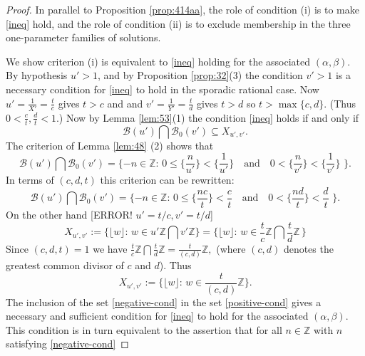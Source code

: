 \documentclass[12pt,letterpaper, reqno]{amsart}
\theoremstyle{definition}
\theoremstyle{remark}
\newcommand{\ZZ}{\ensuremath{\mathbb{Z}}}
\newcommand{\uu}{{u'}}
\newcommand{\vv}{{v'}}
\newcommand{\sB}{{\mathcal B}}
\newcommand{\floor}[1]{\lfloor{#1}\rfloor}
\begin{document}
\begin{proof}
In parallel to Proposition \ref{prop:414aa},   the role of condition (i) is   to make \eqref{ineq} hold, and
the role of  condition (ii) is to exclude membership in the three one-parameter families of solutions. 

We show criterion (i) is equivalent to \eqref{ineq} holding for the associated $(\alpha, \beta)$. 
By hypothesis  ${\uu}>1$, and by  Proposition \ref{prop:32}(3) the condition ${\vv}>1$ is a  necessary condition for \eqref{ineq} to hold
in the sporadic rational case. Now ${\uu} =\frac{1}{X'}= \frac{t}{c}$
gives $t >c$ and and ${\vv} =\frac{1}{Y'}= \frac{t}{d}$ gives
$t>d$ so $t > \max \{ c, d\}.$ (Thus $0 < \frac{c}{t}, \frac{d}{t}<1$.)
Now by Lemma \ref{lem:53}(1)
the condition   \eqref{ineq} holds  if and only if
$$\sB({\uu}) \bigcap \sB_0({\vv}) \subseteq X_{{\uu},{\vv}}.$$
The criterion of Lemma \ref{lem:48} (2) shows that
\[
\sB({\uu}) \bigcap \sB_0({\vv}) = \{ -n \in \ZZ: \, 0 \le \{ \frac{n }{\uu} \}< \{ \frac{1}{\uu}\} \quad \mbox{and} \quad
0 < \{ \frac n \vv \}< \{ \frac1\vv\}\,\, \}.
\]
In terms of $(c,d,t)$  this criterion can be rewritten:
\begin{equation}\label{negative-cond}
\sB({\uu}) \bigcap \sB_0({\vv}) = \{-n \in \ZZ: \,0 \le \{ \frac{nc}{t} \} < \frac{c}{t} \quad \mbox{and} \quad 0 < \{ \frac{nd}{t} \}< \frac{d}{t} \, \, \}.
\end{equation}
On the other hand [ERROR! $u' = t/c, v' = t/d$]
\[
X_{{\uu}, {\vv}} := \{ \floor{ w} : \, w \in {\uu} \ZZ \bigcap {\vv} \ZZ\} =  \{ \floor{w} : \, w \in \frac{t}{c} \ZZ \bigcap \frac{t}{d} \ZZ\, \}
\]
Since $(c, d, t)=1$ we have $\frac{t}{c}\ZZ \bigcap \frac{t}{d}\ZZ = \frac{t}{(c,d)} \ZZ,$ 
(where $(c,d)$ denotes the greatest common divisor of $c$ and $d$). Thus
\begin{equation}\label{positive-cond}
X_{{\uu}, {\vv}} := \{ \floor{w} : \, w \in \frac{t}{(c,d)} \ZZ \}.
\end{equation}
The inclusion of the set \eqref{negative-cond} in the set \eqref{positive-cond} gives
a  necessary and sufficient condition for \eqref{ineq} to hold for the associated $(\alpha, \beta)$.
This condition is in turn equivalent to the assertion that 
for all $n \in \ZZ$ with $n$ satisfying \eqref{negative-cond} 

\end{proof}
\end{document}
